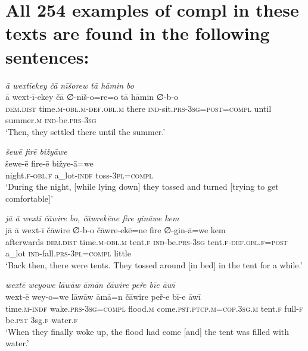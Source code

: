 \chapter{All 254 examples of compl in these texts are found in the following sentences:}

\ea \label{ZB.6}
\textit{ā wextīekey čā nīšorew tā hāmin bo} \\ 
\gll ā wext-ī-ekey čā ∅-nīš-o=re=o tā hāmin ∅-b-o \\ 
 \textsc{dem.dist} time\textsc{.m}\textsc{-obl}\textsc{.m}\textsc{-def}\textsc{.obl}\textsc{.m} there \textsc{ind-}sit\textsc{.prs}\textsc{-3sg}\textsc{=\textsc{post}}\textsc{=compl} until summer\textsc{.m} \textsc{ind-}be\textsc{.prs}\textsc{-3sg} \\ 
\glt `Then, they settled there until the summer.'
\z 
 
\ea \label{ZB.18}
\textit{šewē firē bižyāwe} \\ 
\gll šewe-ē fire-ē bižye-ā=we \\ 
 night\textsc{.f}\textsc{-obl}\textsc{.f} a\_lot\textsc{-indf} toss\textsc{-3pl}\textsc{=compl} \\ 
\glt `During the night, [while lying down] they tossed and turned [trying to get comfortable]'
\z 
 
\ea \label{ZB.19}
\textit{jā ā wextī čāwire bo, čāwrekēne fire gināwe kem} \\ 
\gll jā ā wext-ī čāwire ∅-b-o čāwre-ekē=ne fire ∅-gin-ā=we kem \\ 
 afterwards \textsc{dem.dist} time\textsc{.m}\textsc{-obl}\textsc{.m} tent\textsc{.f} \textsc{ind-}be\textsc{.prs}\textsc{-3sg} tent\textsc{.f}\textsc{-def}\textsc{.obl}\textsc{.f}\textsc{=\textsc{post}} a\_lot \textsc{ind-}fall\textsc{.prs}\textsc{-3pl}\textsc{=compl} little \\ 
\glt `Back then, there were tents. They tossed around [in bed] in the tent for a while.'
\z 
 
\ea \label{ZB.20}
\textit{wextē weyowe lāwāw āmān čāwire peře bīe āwī} \\ 
\gll wext-ē wey-o=we lāwāw āmā=n čāwire peř-e bī-e āwī \\ 
 time\textsc{.m}\textsc{-indf} wake\textsc{.prs}\textsc{-3sg}\textsc{=compl} flood\textsc{.m} come\textsc{.pst}\textsc{.ptcp}\textsc{.m}\textsc{=cop}\textsc{.3sg}\textsc{.m} tent\textsc{.f} full\textsc{-f} be\textsc{.pst} 3sg\textsc{.f} water\textsc{.f} \\ 
\glt `When they finally woke up, the flood had come [and] the tent was filled with water.'
\z 
 
